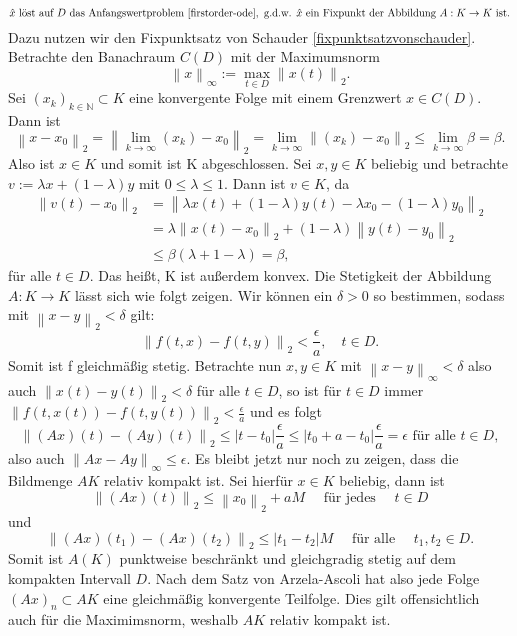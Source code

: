 \[
    \hat{x} \text{ löst auf $D$ das Anfangswertproblem } \eqref{firstorder-ode}, \text{ g.d.w. } \hat{x}
    \text{ ein Fixpunkt der Abbildung } A:K \rightarrow K \text{ ist}.
\]
Dazu nutzen wir den Fixpunktsatz von Schauder \ref{fixpunktsatzvonschauder}. Betrachte den Banachraum $C(D)$ mit der
Maximumsnorm
\[
    \left\lVert x \right\rVert_{\infty}:=\max_{t \in D} \left\lVert x(t) \right\rVert_2.
\]
Sei $(x_k)_{k \in \mathbb{N}} \subset K$ eine konvergente Folge mit einem Grenzwert $x \in C(D)$. Dann ist
\[
    \left\lVert x - x_0 \right\rVert_2 = \left\lVert \lim_{k \rightarrow \infty}(x_k) - x_0 \right\rVert_2
    = \lim_{k \rightarrow \infty} \left\lVert (x_k) - x_0 \right\rVert_2 \leq \lim_{k \rightarrow \infty} \beta = \beta.
\]
Also ist $x \in K$ und somit ist K abgeschlossen. Sei $x,y \in K $ beliebig und betrachte $v:=\lambda x + (1-\lambda)y$
mit $0 \leq \lambda \leq 1$. Dann ist $v \in K$, da
\begin{align*}
    \left\lVert v(t) - x_0 \right\rVert_2
    &= \left\lVert \lambda x(t) + (1-\lambda)y(t) - \lambda x_0 - (1-\lambda)y_0 \right\rVert_2 \\
    &= \lambda \left\lVert x(t) - x_0 \right\rVert_2 + (1 - \lambda) \left\lVert y(t) - y_0 \right\rVert_2 \\
    &\leq \beta (\lambda + 1 - \lambda) = \beta,
\end{align*}
für alle $t \in D$.
Das heißt, K ist außerdem konvex. Die Stetigkeit der Abbildung $A:K \rightarrow K$ lässt sich wie folgt zeigen.
Wir können ein $\delta > 0$ so bestimmen, sodass mit $\left\lVert x - y \right\rVert_2 < \delta$ gilt:
\[
    \left\lVert f(t,x) - f(t,y) \right\rVert_2 < \frac{\epsilon}{a}, \quad t \in D.
\]
Somit ist f gleichmäßig stetig.
Betrachte nun $x, y \in K$ mit $\left\lVert x - y \right\rVert_{\infty} < \delta$ also auch \linebreak
$\left\lVert x(t) - y(t) \right\rVert_2 < \delta$ für alle $t \in D$, so ist für $t \in D$ immer
$\left\lVert f(t,x(t)) - f(t,y(t)) \right\rVert_2 < \frac{\epsilon}{a}$ und es folgt
\[
    \left\lVert (Ax)(t) - (Ay)(t) \right\rVert_2 \leq |t - t_0| \frac{\epsilon}{a} \leq |t_0 + a - t_0| \frac{\epsilon}{a} = \epsilon
    \text{ für alle } t \in D,
\]
also auch $\left\lVert Ax - Ay \right\rVert_{\infty} \leq \epsilon$. Es bleibt jetzt nur noch zu zeigen, dass die
Bildmenge $AK$ relativ kompakt ist. Sei hierfür $x \in K$ beliebig, dann ist
\[
    \left\lVert (Ax)(t) \right\rVert_2 \leq \left\lVert x_0 \right\rVert_2 + aM \quad \text{ für jedes } \quad t \in D
\] und
\[
    \left\lVert (Ax)(t_1) - (Ax)(t_2) \right\rVert_2 \leq |t_1 - t_2| M \quad \text{ für alle } \quad t_1,t_2 \in D.
\]
Somit ist $A(K)$ punktweise beschränkt und gleichgradig stetig auf dem kompakten Intervall $D$. Nach dem Satz von
Arzela-Ascoli \cite[49]{beckGewohnlicheDifferentialgleichungen2018} hat also jede Folge $(Ax)_n\subset AK$ eine
gleichmäßig konvergente Teilfolge. Dies gilt offensichtlich auch für die Maximimsnorm, weshalb $AK$ relativ kompakt
ist. \qedwhite\\

